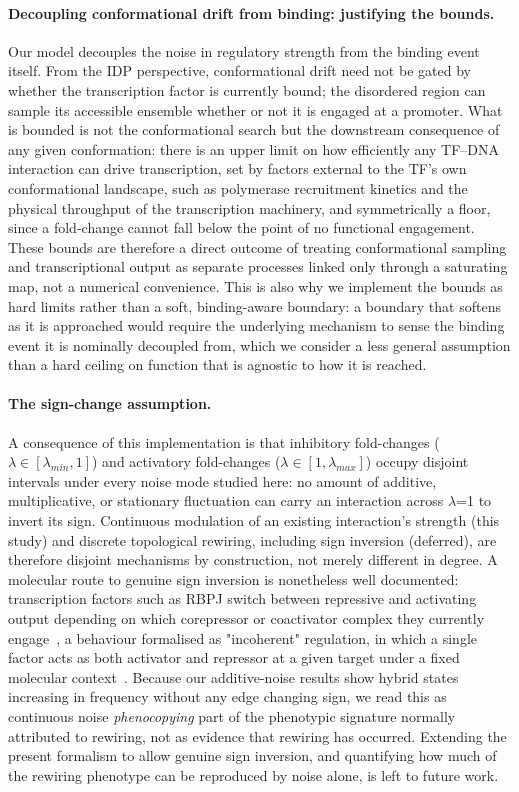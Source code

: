 \documentclass[11pt]{article}
\begin{document}
\paragraph{Decoupling conformational drift from binding: justifying the bounds.}
Our model decouples the noise in regulatory strength from the binding event itself. From the IDP perspective, conformational drift need not be gated by whether the transcription factor is currently bound; the disordered region can sample its accessible ensemble whether or not it is engaged at a promoter. What is bounded is not the conformational search but the downstream consequence of any given conformation: there is an upper limit on how efficiently any TF--DNA interaction can drive transcription, set by factors external to the TF's own conformational landscape, such as polymerase recruitment kinetics and the physical throughput of the transcription machinery, and symmetrically a floor, since a fold-change cannot fall below the point of no functional engagement. These bounds are therefore a direct outcome of treating conformational sampling and transcriptional output as separate processes linked only through a saturating map, not a numerical convenience. This is also why we implement the bounds as hard limits rather than a soft, binding-aware boundary: a boundary that softens as it is approached would require the underlying mechanism to sense the binding event it is nominally decoupled from, which we consider a less general assumption than a hard ceiling on function that is agnostic to how it is reached.

\paragraph{The sign-change assumption.}
A consequence of this implementation is that inhibitory fold-changes ($\lambda \in [\lambda_{min},1]$) and activatory fold-changes ($\lambda \in [1, \lambda_{max}]$) occupy disjoint intervals under every noise mode studied here: no amount of additive, multiplicative, or stationary fluctuation can carry an interaction across $\lambda$=1 to invert its sign. Continuous modulation of an existing interaction's strength (this study) and discrete topological rewiring, including sign inversion (deferred), are therefore disjoint mechanisms by construction, not merely different in degree. A molecular route to genuine sign inversion is nonetheless well documented: transcription factors such as RBPJ switch between repressive and activating output depending on which corepressor or coactivator complex they currently engage~\cite{Dong2026MolecularFunctions}, a behaviour formalised as "incoherent" regulation, in which a single factor acts as both activator and repressor at a given target under a fixed molecular context~\cite{Martinez-Corral2025EmergenceContext}. Because our additive-noise results show hybrid states increasing in frequency without any edge changing sign, we read this as continuous noise \emph{phenocopying} part of the phenotypic signature normally attributed to rewiring, not as evidence that rewiring has occurred. Extending the present formalism to allow genuine sign inversion, and quantifying how much of the rewiring phenotype can be reproduced by noise alone, is left to future work.
\end{document}
